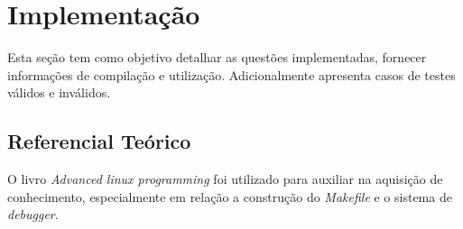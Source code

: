   \chapter[Implementação]{Implementação}

  Esta seção tem como objetivo detalhar as questões implementadas, fornecer informações de compilação e utilização. Adicionalmente apresenta casos de testes válidos e inválidos.





\section[Referencial Teórico]{Referencial Teórico}

  O livro \textit{Advanced linux programming} \cite{advancedlinux} foi utilizado para auxiliar na aquisição de conhecimento, especialmente em relação a construção do \textit{Makefile} e o sistema de \textit{debugger}.
